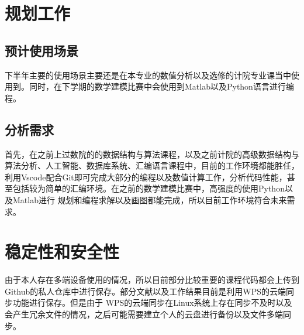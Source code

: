 \newpage
\section{规划工作}
\subsection{预计使用场景}
下半年主要的使用场景主要还是在本专业的数值分析以及选修的计院专业课当中使用到。同时，在下学期的数学建模比赛中会使用到Matlab以及Python语言进行编程。
\subsection{分析需求}
首先，在之前上过数院的的数据结构与算法课程，以及之前计院的高级数据结构与算法分析、人工智能、数据库系统、汇编语言课程中，目前的工作环境都能胜任，
利用Vscode配合Git即可完成大部分的编程以及数值计算工作，分析代码性能，甚至包括较为简单的汇编环境。在之前的数学建模比赛中，高强度的使用Python以及Matlab进行
规划和编程求解以及画图都能完成，所以目前工作环境符合未来需求。

\section{稳定性和安全性}
由于本人存在多端设备使用的情况，所以目前部分比较重要的课程代码都会上传到Github的私人仓库中进行保存。部分文献以及工作结果目前是利用WPS的云端同步功能进行保存。但是由于
WPS的云端同步在Linux系统上存在同步不及时以及会产生冗余文件的情况，之后可能需要建立个人的云盘进行备份以及文件多端同步。
